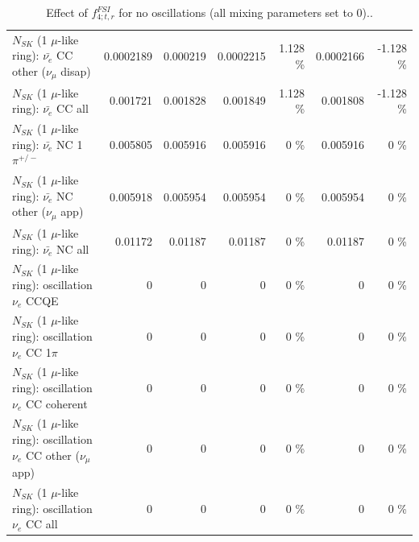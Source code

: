 \begin{table}
\begin{tabular}{| l | r | r | r  r | r  r |}
          $N_{SK}$ (1 $\mu$-like ring): $\bar{\nu_e}$ CC other ($\nu_\mu$ disap) &       0.0002189 &        0.000219 &       0.0002215 &    1.128 \%  &       0.0002166 &   -1.128 \%  \\ 
                            $N_{SK}$ (1 $\mu$-like ring): $\bar{\nu_{e}}$ CC all &        0.001721 &        0.001828 &        0.001849 &    1.128 \%  &        0.001808 &   -1.128 \%  \\ 
\hline
                     $N_{SK}$ (1 $\mu$-like ring): $\bar{\nu_e}$ NC 1$\pi^{+/-}$ &        0.005805 &        0.005916 &        0.005916 &        0 \%  &        0.005916 &        0 \%  \\ 
            $N_{SK}$ (1 $\mu$-like ring): $\bar{\nu_e}$ NC other ($\nu_\mu$ app) &        0.005918 &        0.005954 &        0.005954 &        0 \%  &        0.005954 &        0 \%  \\ 
                            $N_{SK}$ (1 $\mu$-like ring): $\bar{\nu_{e}}$ NC all &         0.01172 &         0.01187 &         0.01187 &        0 \%  &         0.01187 &        0 \%  \\ 
\hline
\hline
\hline
                          $N_{SK}$ (1 $\mu$-like ring): oscillation $\nu_e$ CCQE &               0 &               0 &               0 &        0 \%  &               0 &        0 \%  \\ 
                     $N_{SK}$ (1 $\mu$-like ring): oscillation $\nu_e$ CC 1$\pi$ &               0 &               0 &               0 &        0 \%  &               0 &        0 \%  \\ 
                   $N_{SK}$ (1 $\mu$-like ring): oscillation $\nu_e$ CC coherent &               0 &               0 &               0 &        0 \%  &               0 &        0 \%  \\ 
      $N_{SK}$ (1 $\mu$-like ring): oscillation $\nu_e$ CC other ($\nu_\mu$ app) &               0 &               0 &               0 &        0 \%  &               0 &        0 \%  \\ 
                       $N_{SK}$ (1 $\mu$-like ring): oscillation $\nu_e$  CC all &               0 &               0 &               0 &        0 \%  &               0 &        0 \%  \\ 
\hline
\hline
\end{tabular}
\caption{ Effect of $f_{4; t, r}^{FSI}$ for no oscillations (all mixing parameters set to 0).. }
\label{tab:num_fsi_004_1RmuT_3f_osc_t13:0_spectralreco_spectraltrue}
\end{table}
\clearpage

